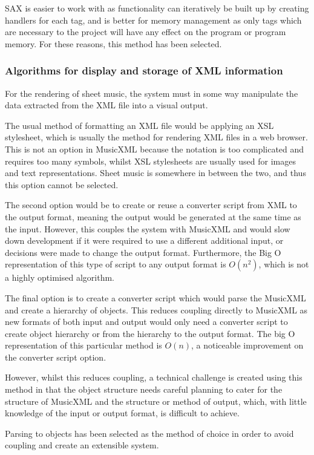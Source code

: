 SAX is easier to work with as functionality can iteratively be built up by creating handlers for each tag, and is better for memory management as only tags which are necessary to the project will have any effect on the program or program memory. For these reasons, this method has been selected.



\subsubsection{Algorithms for display and storage of XML information}
For the rendering of sheet music, the system must in some way manipulate the data extracted from the XML file into a visual output.

The usual method of formatting an XML file would be applying an XSL stylesheet, which is usually the method for rendering XML files in a web browser. This is not an option in MusicXML because the notation is too complicated and requires too many symbols, whilst XSL stylesheets are usually used for images and text representations. Sheet music is somewhere in between the two, and thus this option cannot be selected.

The second option would be to create or reuse a converter script from XML to the output format, meaning the output would be generated at the same time as the input. However, this couples the system with MusicXML and would slow down development if it were required to use a different additional input, or decisions were made to change the output format. Furthermore, the Big O representation of this type of script to any output format is $O(n^2)$, which is not a highly optimised algorithm.

The final option is to create a converter script which would parse the MusicXML and create a hierarchy of objects. This reduces coupling directly to MusicXML as new formats of both input and output would only need a converter script to create object hierarchy or from the hierarchy to the output format. The big O representation of this particular method is $O(n)$, a noticeable improvement on the converter script option.

However, whilst this reduces coupling, a technical challenge is created using this method in that the object structure needs careful planning to cater for the structure of MusicXML and the structure or method of output, which, with little knowledge of the input or output format, is difficult to achieve.

Parsing to objects has been selected as the method of choice in order to avoid coupling and create an extensible system.

